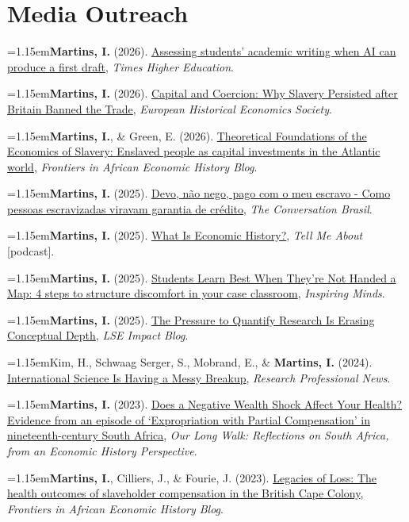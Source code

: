 \documentclass[11pt,a4paper]{article}
\newcommand{\cvlistitem}[1]{\par\addvspace{5pt}\noindent
  \textcolor{accent}{\raisebox{.45ex}{\rule{3.2pt}{3.2pt}}}\hspace{7pt}%
  \begin{minipage}[t]{\dimexpr\linewidth-12pt\relax}\hangindent=1.15em\hangafter=1\relax #1\par\end{minipage}\par}
\let\originalsection\section
\renewcommand{\section}[1]{\par\Needspace{110pt}\originalsection{#1}}
\begin{document}
\section{Media Outreach}
\cvlistitem{\textbf{Martins, I.} (2026). \href{https://www.timeshighereducation.com/campus/assessing-students-academic-writing-when-ai-can-produce-first-draft}{Assessing students' academic writing when AI can produce a first draft}, \textit{Times Higher Education}.}
\smallskip
\cvlistitem{\textbf{Martins, I.} (2026). \href{https://ehes.org/2026/04/27/capital-and-coercion-why-slavery-persisted-after-britain-banned-the-trade/}{Capital and Coercion: Why Slavery Persisted after Britain Banned the Trade}, \textit{European Historical Economics Society}.}
\smallskip
\cvlistitem{\textbf{Martins, I.}, \& Green, E. (2026). \href{https://www.aehnetwork.org/blog/theoretical-foundations-of-the-economics-of-slavery-enslaved-people-as-capital-investments-in-the-atlantic-world/}{Theoretical Foundations of the Economics of Slavery: Enslaved people as capital investments in the Atlantic world}, \textit{Frontiers in African Economic History Blog}.}
\smallskip
\cvlistitem{\textbf{Martins, I.} (2025). \href{https://theconversation.com/devo-nao-nego-pago-com-o-meu-escravo-como-pessoas-escravizadas-viravam-garantia-de-credito-272231}{Devo, não nego, pago com o meu escravo - Como pessoas escravizadas viravam garantia de crédito}, \textit{The Conversation Brasil}.}
\smallskip
\cvlistitem{\textbf{Martins, I.} (2025). \href{https://open.spotify.com/episode/0ECMyrOOI3TqKdnoJVfOod}{What Is Economic History?}, \textit{Tell Me About} [podcast].}
\smallskip
\cvlistitem{\textbf{Martins, I.} (2025). \href{https://hbsp.harvard.edu/inspiring-minds/students-learn-through-discomfort}{Students Learn Best When They're Not Handed a Map: 4 steps to structure discomfort in your case classroom}, \textit{Inspiring Minds}.}
\smallskip
\cvlistitem{\textbf{Martins, I.} (2025). \href{https://blogs.lse.ac.uk/impactofsocialsciences/2025/06/11/the-pressure-to-quantify-research-is-erasing-conceptual-depth/}{The Pressure to Quantify Research Is Erasing Conceptual Depth}, \textit{LSE Impact Blog}.}
\smallskip
\cvlistitem{Kim, H., Schwaag Serger, S., Mobrand, E., \& \textbf{Martins, I.} (2024). \href{https://www.researchprofessionalnews.com/rr-news-europe-views-of-europe-2024-3-international-science-is-having-a-messy-breakup/}{International Science Is Having a Messy Breakup}, \textit{Research Professional News}.}
\smallskip
\cvlistitem{\textbf{Martins, I.} (2023). \href{https://www.ourlongwalk.com/p/guest-post-does-a-negative-wealth}{Does a Negative Wealth Shock Affect Your Health? Evidence from an episode of `Expropriation with Partial Compensation' in nineteenth-century South Africa}, \textit{Our Long Walk: Reflections on South Africa, from an Economic History Perspective}.}
\smallskip
\cvlistitem{\textbf{Martins, I.}, Cilliers, J., \& Fourie, J. (2023). \href{https://www.aehnetwork.org/blog/legacies-of-loss-the-health-outcomes-of-slaveholder-compensation-in-the-british-cape-colony/}{Legacies of Loss: The health outcomes of slaveholder compensation in the British Cape Colony}, \textit{Frontiers in African Economic History Blog}.}
\end{document}
